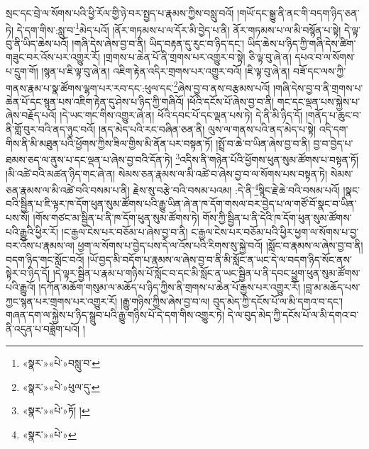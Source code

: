 སྲང་དང་བྲེ་ལ་སོགས་པའི་ཕྱི་རོལ་གྱི་ཉེ་བར་སྤྱད་པ་རྣམས་ཀྱིས་བསླུ་བའོ། །གཡོ་དང་སྒྱུ་ནི་ནང་གི་བདག་ཉིད་ཅན་ཏེ། དེ་དག་གིས་:སླུ་བ་\footnote{«སྣར་»«པེ་»བསླུ་བ་}མེད་པའོ། །ནོར་གཏམས་པ་ལ་དོར་མི་བྱེད་པ་ནི། ནོར་གཏམས་པ་ལ་མི་བསྙོན་པ་སྟེ། དེ་ལྟ་བུ་ནི་ཡིད་ཆེས་པའོ། །གཞི་དེས་ཞེས་བྱ་བ་ནི། ཡིད་བརྟན་དུ་རུང་བ་ཉིད་དང་། ཡིད་ཆེས་པ་ཉིད་ཀྱི་གཞི་དེས་ཚིག་གཟུང་བར་འོས་པར་འགྱུར་རོ། །གྲགས་པ་ཆེན་པོ་ནི་གྲགས་པར་འགྱུར་བ་སྟེ། ཅི་ལྟ་བུ་ཞེ་ན། དཔའ་བ་ལ་སོགས་པ་དྲུག་གོ། །སྙན་པ་ཇི་ལྟ་བུ་ཞེ་ན། འཇིག་རྟེན་འདིར་གྲགས་པར་འགྱུར་བའོ། །ཇི་ལྟ་བུ་ཞེ་ན། བཟོ་དང་ལས་ཀྱི་གནས་རྣམ་པ་སྣ་ཚོགས་ལྷག་པར་རབ་དང་:ཕུལ་དང་\footnote{«སྣར་»«པེ་»ཕུལ་དུ་}ཞེས་བྱ་བ་ནས་བརྩམས་པའོ། །གཞི་དེས་བྱ་བ་ནི་གྲགས་པ་ཆེན་པོ་དང་སྙན་པས་འཇིག་རྟེན་དུ་ཤེས་པ་ཉིད་ཀྱི་གཞིའོ། །ཕོའི་དངོས་པོ་ཞེས་བྱ་བ་ནི། གང་དང་ལྡན་པས་སྐྱེས་པ་ཞེས་བརྗོད་པའོ། །དེ་ཡང་གང་གིས་འགྱུར་ཞེ་ན། ཕོའི་དབང་པོ་དང་ལྡན་པས་ཏེ། དེ་ནི་མི་ཉིད་དོ། །གནོད་པ་ཆུང་བ་ནི་གློ་བུར་བའི་ནད་ཉུང་བའོ། །ནད་མེད་པའི་རང་བཞིན་ཅན་ནི། ལུས་ལ་གནས་པའི་ནད་མེད་པ་སྟེ། འདི་དག་གིས་ནི་མི་མཐུན་པའི་ཕྱོགས་ཀྱིས་ཟིལ་གྱིས་མི་ནོན་པར་བསྟན་ཏོ། །སྤྲོ་བ་ཆེ་བ་ཡིན་ཞེས་བྱ་བ་ནི། བྱ་བ་བྱེད་པ་ཐམས་ཅད་ལ་ནུས་པ་དང་ལྡན་པ་ཞེས་བྱ་བའི་དོན་ཏེ། \footnote{«སྣར་»«པེ་»ཏོ། ། }འདིས་ནི་གཉེན་པོའི་ཕྱོགས་ཕུན་སུམ་ཚོགས་པ་བསྟན་ཏོ། །མི་འཚེ་བའི་མཚན་ཉིད་གང་ཞེ་ན། སེམས་ཅན་རྣམས་ལ་མི་འཚེ་བ་ཞེས་བྱ་བ་ལ་སོགས་པས་བསྟན་ཏེ། སེམས་ཅན་རྣམས་ལ་མི་འཚེ་བའི་བསམ་པ་ནི། རྗེས་སུ་བརྩེ་བའི་བསམ་པའམ། :དེ་ནི་\footnote{«སྣར་»«པེ་»}སྙིང་རྗེ་ཆེ་བའི་བསམ་པའོ། །སྣང་བའི་སྦྱིན་པ་ཇི་ལྟར་ཁ་དོག་ཕུན་སུམ་ཚོགས་པའི་རྒྱུ་ཡིན་ཞེ་ན་ཁ་དོག་གསལ་བར་བྱེད་པ་ལ་གཙོ་བོ་སྣང་བ་ཡིན་པས་སོ། །གོས་གཙང་མ་སྦྱིན་པ་ནི་ཁ་དོག་ཕུན་སུམ་ཚོགས་ཏེ། གོས་ཀྱི་སྦྱིན་པ་ནི་དེའི་ཁ་དོག་ཕུན་སུམ་ཚོགས་པའི་རྒྱུའི་ཕྱིར་རོ། །ང་རྒྱལ་ངེས་པར་བཅོམ་པ་ཞེས་བྱ་བ་ནི། ང་རྒྱལ་ངེས་པར་བཅོམ་པའི་ཕྱིར་ཕྱག་ལ་སོགས་པ་བྱ་བར་འོས་པ་རྣམས་ལ། ཕྱག་ལ་སོགས་པ་བྱེད་པས་དེ་ལ་འོས་པའི་རིགས་སུ་སྐྱེ་བའོ། །སློང་བ་རྣམས་ལ་ཞེས་བྱ་བ་ནི། བདག་ཉིད་གང་སློང་བའོ། །ཡོ་བྱད་མི་བདོག་པ་རྣམས་ལ་ཞེས་བྱ་བ་ནི་མི་སློང་ན་ཡང་དེ་ལ་བདག་ཉིད་སོང་ནས་སྟེར་བ་ཉིད་དོ། །དེ་ལྟར་སྦྱིན་པ་རྣམ་པ་གཉིས་པོ་སློང་བ་དང་མི་སློང་ན་ཡང་སྦྱིན་པ་ནི་དབང་ཕྱུག་ཕུན་སུམ་ཚོགས་པའི་རྒྱུའོ། །དཀོན་མཆོག་གསུམ་ལ་མཆོད་པ་ཉིད་ཀྱིས་ནི་གྲགས་པ་ཆེན་པོ་རྒྱས་པར་འགྱུར་རོ། །བླ་མ་མཆོད་པས་ཀྱང་སྙན་པར་གྲགས་པར་འགྱུར་རོ། །རྒྱུ་གཉིས་ཀྱིས་ཞེས་བྱ་བ་ལ། བུད་མེད་ཀྱི་དངོས་པོ་ལ་མི་དགའ་བ་དང་། གཞན་དག་ལ་སྐྱེས་པ་ཉིད་སྒྲུབ་པའི་རྒྱུ་གཉིས་པོ་དེ་དག་གིས་འགྱུར་ཏེ། དེ་ལ་བུད་མེད་ཀྱི་དངོས་པོ་ལ་མི་དགའ་བ་ནི་འདུན་པ་བཟློག་པའོ། །
